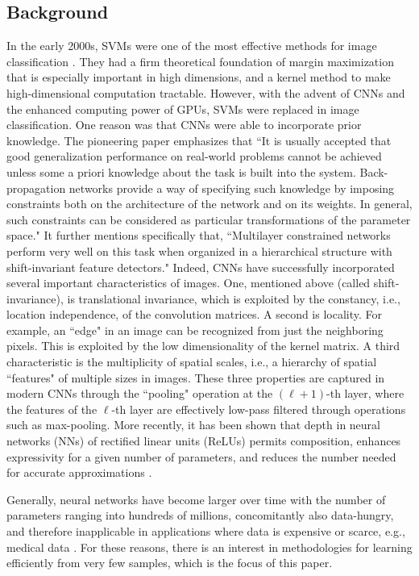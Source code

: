 \documentclass{article}
\theoremstyle{plain}
\theoremstyle{definition}
\theoremstyle{remark}
\begin{document}
\subsection{Background}
In the early 2000s, SVMs \cite{cortes1995support} were one of the most effective methods for image classification \cite{lu2007survey}. They had a firm theoretical foundation of margin maximization \cite{vapnik1995nature,boser1992training} that is especially important in high dimensions, and a kernel method to make high-dimensional computation tractable. However, with the advent of CNNs and the enhanced computing power of GPUs,  SVMs were replaced in image classification. One reason was that CNNs were able to incorporate prior knowledge. The pioneering paper \cite{lecun1989generalization} emphasizes that ``It is usually accepted that good generalization performance on real-world problems cannot be achieved unless some a priori knowledge about the task is built into the system. Back-propagation networks provide a way of specifying such knowledge by imposing constraints both on the architecture of the network and on its weights. In general, such constraints can be considered as particular transformations of the parameter space." It further mentions specifically that, ``Multilayer constrained networks perform very well on this task when organized in a hierarchical structure with shift-invariant feature detectors." Indeed, CNNs have successfully incorporated several important characteristics of images. One, mentioned above (called shift-invariance), is translational invariance, which is exploited by the constancy, i.e., location independence, of the convolution matrices. A second is locality. For example, an ``edge" in an image can be recognized from just the neighboring pixels. This is exploited by the low dimensionality of the kernel matrix. A third characteristic is the multiplicity of spatial scales, i.e., a hierarchy of spatial ``features" of multiple sizes in images. These three properties are captured in modern CNNs through the ``pooling" operation at the $(\ell+1)$-th layer, where the features of the $\ell$-th layer are effectively low-pass filtered through operations such as max-pooling. More recently, it has been shown that depth in neural networks (NNs) of rectified linear units (ReLUs) permits composition, enhances expressivity for a given number of parameters, and reduces the number needed for accurate approximations \cite{daubechies2021nonlinear}. 

Generally, neural networks have become larger over time with the number of parameters ranging into hundreds of millions, concomitantly also data-hungry, and therefore inapplicable in applications where data is expensive or scarce, e.g., medical data \cite{Willwe2020}. For these reasons, there is an interest in methodologies for learning efficiently from very few samples, which is the focus of this paper.
\end{document}
